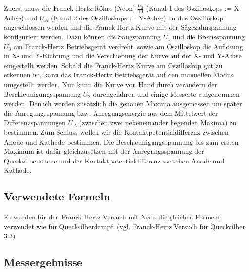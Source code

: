 \documentclass[12pt,a4paper]{article}
\begin{document}
Zuerst muss die Franck-Hertz Röhre (Neon) $\frac{U_2}{10}$ (Kanal 1 des Oszilloskops := X-Achse) und $U_A$ (Kanal 2 des Oszilloskops := Y-Achse) an das Oszilloskop angeschlossen werden und die Franck-Hertz Kurve mit der Sägezahnspannung konfiguriert werden. Dazu können die Saugspannung $U_1$ und die Bremsspannung $U_3$ am Franck-Hertz Betriebsgerät verdreht, sowie
am Oszilloskop die Auflösung in X- und Y-Richtung und die Verschiebung der Kurve auf der X- und Y-Achse eingestellt werden.
Sobald die Franck-Hertz Kurve am Oszilloskop gut zu erkennen ist, kann das Franck-Hertz Betriebsgerät auf den manuellen Modus umgestellt werden. Nun kann die Kurve von Hand durch verändern der Beschleunigungsspannung $U_2$ durchgefahren und einige Messerte aufgenommen werden. Danach werden zusätzlich die genauen Maxima ausgemessen um später die Anregungsspannung bzw. Anregungsenergie aus dem Mittelwert der Differenzspannungen $U_{\Delta}$ (zwischen zwei nebeneinander liegenden Maxima) zu bestimmen.
Zum Schluss wollen wir die Kontaktpotentialdifferenz zwischen Anode und Kathode bestimmen.
Die Beschleunigungsspannung bis zum ersten Maximum ist dafür gleichzusetzen mit der Anregungsspannung der Quecksilberatome und der Kontaktpotentialdifferenz zwischen Anode und Kathode.

\subsection{Verwendete Formeln}
Es wurden für den Franck-Hertz Versuch mit Neon die gleichen Formeln verwendet wie für Quecksilberdampf. (vgl. Franck-Hertz Versuch für Quecksilber 3.3)
\subsection{Messergebnisse}
\end{document}
